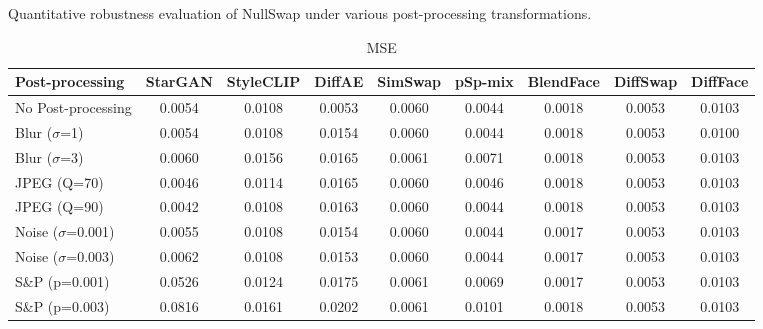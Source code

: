 \documentclass{article}
\begin{document}
\begin{table}[h!]
\caption{Quantitative robustness evaluation of NullSwap under various post-processing transformations.}
\label{tab:robust_nullswap}
\centering
\small

\begin{subtable}{\textwidth}
\caption{MSE}
\centering
\scriptsize
\begin{tabular}{lcccccccc}
\toprule
\textbf{Post-processing} & StarGAN & StyleCLIP & DiffAE & SimSwap & pSp-mix & BlendFace & DiffSwap & DiffFace \\
\midrule
No Post-processing & 0.0054 & 0.0108 & 0.0053 & 0.0060 & 0.0044 & 0.0018 & 0.0053 & 0.0103 \\
\midrule
Blur ($\sigma$=1) & 0.0054 & 0.0108 & 0.0154 & 0.0060 & 0.0044 & 0.0018 & 0.0053 & 0.0100 \\
Blur ($\sigma$=3) & 0.0060 & 0.0156 & 0.0165 & 0.0061 & 0.0071 & 0.0018 & 0.0053 & 0.0103 \\
JPEG (Q=70) & 0.0046 & 0.0114 & 0.0165 & 0.0060 & 0.0046 & 0.0018 & 0.0053 & 0.0103 \\
JPEG (Q=90) & 0.0042 & 0.0108 & 0.0163 & 0.0060 & 0.0044 & 0.0018 & 0.0053 & 0.0103 \\
Noise ($\sigma$=0.001) & 0.0055 & 0.0108 & 0.0154 & 0.0060 & 0.0044 & 0.0017 & 0.0053 & 0.0103 \\
Noise ($\sigma$=0.003) & 0.0062 & 0.0108 & 0.0153 & 0.0060 & 0.0044 & 0.0017 & 0.0053 & 0.0103 \\
S\&P (p=0.001) & 0.0526 & 0.0124 & 0.0175 & 0.0061 & 0.0069 & 0.0017 & 0.0053 & 0.0103 \\
S\&P (p=0.003) & 0.0816 & 0.0161 & 0.0202 & 0.0061 & 0.0101 & 0.0018 & 0.0053 & 0.0103 \\
\bottomrule
\end{tabular}
\end{subtable}


\end{table}
\end{document}
